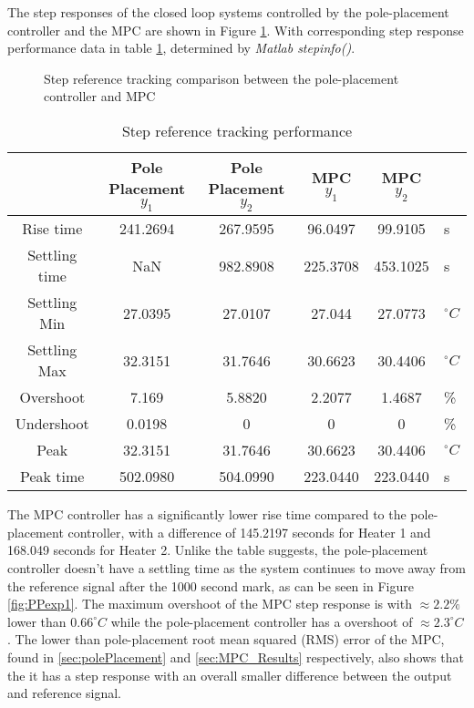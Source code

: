 The step responses of the closed loop systems controlled by the pole-placement controller and the MPC are shown in Figure \ref{fig:compStepC}. With corresponding step response performance data in table \ref{tab:stepinfo}, determined by \textit{Matlab stepinfo()}.
\begin{figure}
    \centering
    
    \caption{Step reference tracking comparison between the pole-placement controller and MPC}
    \label{fig:compStepC}
\end{figure}
\begin{table}[h]
    \centering
    \caption{Step reference tracking performance}
    \begin{tabular}{c|c|c|c|c|l}
         & Pole Placement $y_1$ & Pole Placement $y_2$ & MPC $y_1$ & MPC $y_2$ &  \\
        \hline
        Rise time & 241.2694 & 267.9595 & 96.0497 & 99.9105 & s\\
        Settling time & NaN & 982.8908 & 225.3708 & 453.1025 & s\\
        Settling Min & 27.0395 & 27.0107 & 27.044 & 27.0773 & $^{\circ}C$\\
        Settling Max & 32.3151 & 31.7646 & 30.6623 & 30.4406 & $^{\circ}C$\\
        Overshoot & 7.169 & 5.8820 & 2.2077 & 1.4687 & \%\\
        Undershoot & 0.0198 & 0 & 0 & 0& \% \\
        Peak & 32.3151 & 31.7646 & 30.6623 & 30.4406 & $^{\circ}C$\\
        Peak time & 502.0980 & 504.0990 & 223.0440 & 223.0440 & s 
    \end{tabular}
    \label{tab:stepinfo}
\end{table}
The MPC controller has a significantly lower rise time compared to the pole-placement controller, with a difference of 145.2197 seconds for Heater 1 and 168.049 seconds for Heater 2. Unlike the table suggests, the pole-placement controller doesn't have a settling time as the system continues to move away from the reference signal after the 1000 second mark, as can be seen in Figure \ref{fig:PPexp1}. The maximum overshoot of the MPC step response is with $\approx 2.2\%$ lower than $0.66 ^{\circ}C$ while the pole-placement controller has a overshoot of $\approx 2.3 ^{\circ}C$. The lower than pole-placement root mean squared (RMS) error of the MPC, found in \ref{sec:polePlacement} and \ref{sec:MPC_Results} respectively, also shows that the it has a step response with an overall smaller difference between the output and reference signal.    

